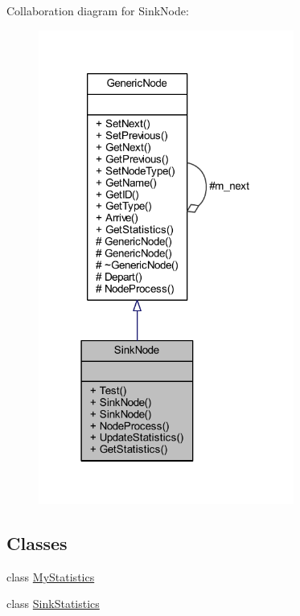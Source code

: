 Collaboration diagram for Sink\+Node\+:
\nopagebreak
\begin{figure}[H]
\begin{center}
\leavevmode
\includegraphics[width=238pt]{class_sink_node__coll__graph}
\end{center}
\end{figure}
\subsection*{Classes}
\begin{DoxyCompactItemize}
\item 
class \hyperlink{class_sink_node_1_1_my_statistics}{My\+Statistics}
\item 
class \hyperlink{class_sink_node_1_1_sink_statistics}{Sink\+Statistics}
\end{DoxyCompactItemize}
